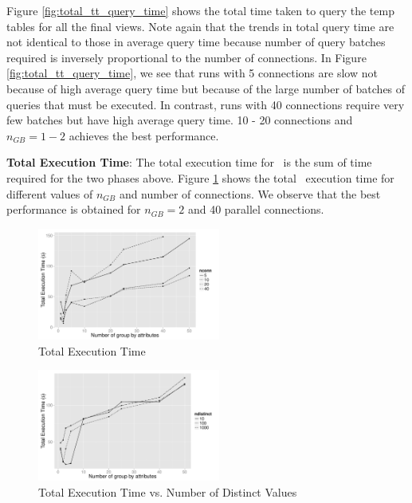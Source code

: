 Figure \ref{fig:total_tt_query_time} shows the total time taken to query the
temp tables for all the final views. Note again that the trends in total query
time are not identical to those in average query time because number of query
batches required is inversely proportional to the number of connections.
In Figure \ref{fig:total_tt_query_time}, we see that runs with 5 connections are
slow not because of high average query time but because of the large number of
batches of queries that must be executed. In contrast, runs with 40 connections
require very few batches but have high average query time. 10 - 20 connections
and $n_{GB}=1-2$ achieves the best performance.



{\bf Total Execution Time}: The total execution time for \VizRecDB\ is the sum of
time required for the two phases above. Figure \ref{fig:total_time} shows the
total \VizRecDB\ execution time for different values of $n_{GB}$ and number of
connections. We observe that the best performance is obtained for
$n_{GB}=2$ and 40 parallel connections.

\begin{figure}[h]
     \centering
    \includegraphics[width=6cm]{Images/mult_gb_total.pdf}
    \caption{Total Execution Time}
  \label{fig:total_time}
\end{figure}

\begin{figure}[h]
  \centering
    \includegraphics[width=6cm]{Images/mult_gb_diff_distinct.pdf}
    \caption{Total Execution Time vs. Number of Distinct Values} 
  \label{fig:total_time_diff_distinct}

\end{figure}

